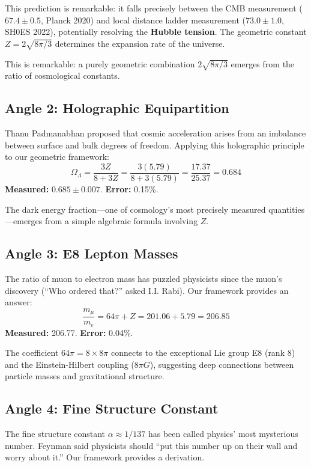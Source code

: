 \documentclass[11pt,a4paper]{article}
\theoremstyle{plain}
\theoremstyle{definition}
\theoremstyle{remark}
\newcommand{\OmegaL}{\Omega_\Lambda}
\begin{document}
This prediction is remarkable: it falls precisely between the CMB measurement ($67.4 \pm 0.5$, Planck 2020) and local distance ladder measurement ($73.0 \pm 1.0$, SH0ES 2022), potentially resolving the \textbf{Hubble tension}. The geometric constant $Z = 2\sqrt{8\pi/3}$ determines the expansion rate of the universe.

This is remarkable: a purely geometric combination $2\sqrt{8\pi/3}$ emerges from the ratio of cosmological constants.

\subsection{Angle 2: Holographic Equipartition}

Thanu Padmanabhan proposed that cosmic acceleration arises from an imbalance between surface and bulk degrees of freedom. Applying this holographic principle to our geometric framework:
\[
\OmegaL = \frac{3Z}{8 + 3Z} = \frac{3(5.79)}{8 + 3(5.79)} = \frac{17.37}{25.37} = 0.684
\]
\textbf{Measured:} $0.685 \pm 0.007$. \textbf{Error:} 0.15\%.

The dark energy fraction---one of cosmology's most precisely measured quantities---emerges from a simple algebraic formula involving $Z$.

\subsection{Angle 3: E8 Lepton Masses}

The ratio of muon to electron mass has puzzled physicists since the muon's discovery (``Who ordered that?'' asked I.I. Rabi). Our framework provides an answer:
\[
\frac{m_\mu}{m_e} = 64\pi + Z = 201.06 + 5.79 = 206.85
\]
\textbf{Measured:} 206.77. \textbf{Error:} 0.04\%.

The coefficient $64\pi = 8 \times 8\pi$ connects to the exceptional Lie group E8 (rank 8) and the Einstein-Hilbert coupling ($8\pi G$), suggesting deep connections between particle masses and gravitational structure.

\subsection{Angle 4: Fine Structure Constant}

The fine structure constant $\alpha \approx 1/137$ has been called physics' most mysterious number. Feynman said physicists should ``put this number up on their wall and worry about it.'' Our framework provides a derivation.
\end{document}
